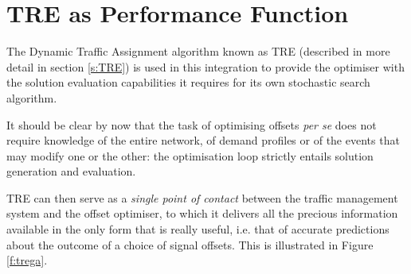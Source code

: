 \section{TRE as Performance Function}
The Dynamic Traffic Assignment algorithm known as TRE (described in more detail in section \ref{s:TRE}) is used in this integration to provide the optimiser with the solution evaluation capabilities it requires for its own stochastic search algorithm.

It should be clear by now that the task of optimising offsets \emph{per se} does not require knowledge of the entire network, of demand profiles or of the events that may modify one or the other: the optimisation loop strictly entails solution generation and evaluation.

TRE can then serve as a \emph{single point of contact} between the traffic management system and the offset optimiser, to which it delivers all the precious information available in the only form that is really useful, i.e. that of accurate predictions about the outcome of a choice of signal offsets. This is illustrated in Figure \ref{f:trega}.


